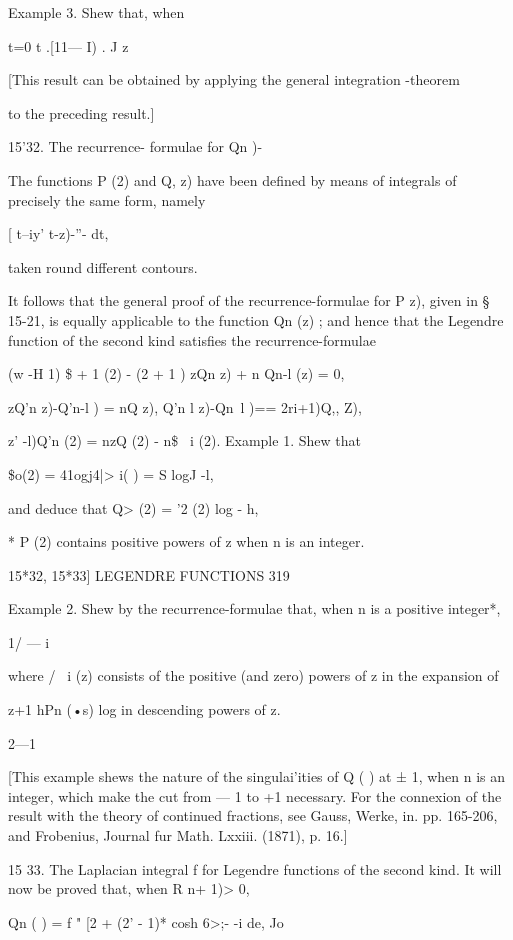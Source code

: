 {{Example 3. Shew that, when %

t=0 t .[11— I) . J z

[This result can be obtained by applying the general integration
-theorem

to the preceding result.]

15'32. The recurrence- formulae for Qn )-

The functions P (2) and Q, z) have been defined by means of integrals
of precisely the same form, namely

[ t--iy' t-z)-''- dt,

taken round different contours.

It follows that the general proof of the recurrence-formulae for P z),
given in § 15-21, is equally applicable to the function Qn (z) ; and
hence that the Legendre function of the second kind satisfies the
recurrence-formulae

(w -H 1) \$ + 1 (2) - (2 + 1 ) zQn z) + n Qn-l (z) = 0,

zQ'n z)-Q'n-l ) = nQ z), Q'n l z)-Qn~l )== 2ri+1)Q,, Z),

 z' -l)Q'n (2) = nzQ (2) - n\$ \ i (2). Example 1. Shew that

\$o(2) = 41ogj4|> i( ) = S logJ -l,

and deduce that Q> (2) = '2 (2) log - h,

* P (2) contains positive powers of z when n is an integer.



15*32, 15*33] LEGENDRE FUNCTIONS 319

Example 2. Shew by the recurrence-formulae that, when n is a positive
integer*,

 1/ — i

where / \ i (z) consists of the positive (and zero) powers of z in the
expansion of

z+1 hPn (•s) log in descending powers of z.

2—1

[This example shews the nature of the singulai'ities of Q ( ) at ± 1,
when n is an integer, which make the cut from — 1 to +1 necessary. For
the connexion of the result with the theory of continued fractions,
see Gauss, Werke, in. pp. 165-206, and Frobenius, Journal fur Math.
Lxxiii. (1871), p. 16.]

15 33. The Laplacian integral f for Legendre functions of the second
kind. It will now be proved that, when R n+ 1)> 0,

Qn ( ) = f " [2 + (2' - 1)* cosh 6>;- -i de, Jo

}}
